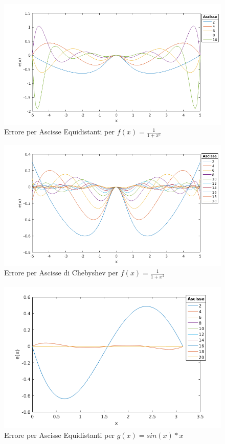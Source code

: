\begin{figure}
\includegraphics[width=\textwidth]{cap_4/es2/Runge_equi_err.png}
\caption{Errore per Ascisse Equidistanti per $f(x) = \frac{1}{1+x^2}$}
\label{RungeEqErr}
\end{figure}
\begin{figure}
\includegraphics[width=\textwidth]{cap_4/es2/Runge_cheb_err.png}
\caption{Errore per Ascisse di Chebyshev per $f(x) = \frac{1}{1+x^2}$}
\label{RungeCheErr}
\end{figure}
\begin{figure}
\includegraphics[width=\textwidth]{cap_4/es2/Sin_equi_err.png}
\caption{Errore per Ascisse Equidistanti per $g(x) = sin(x)*x$}
\label{SinEqErr}
\end{figure}
